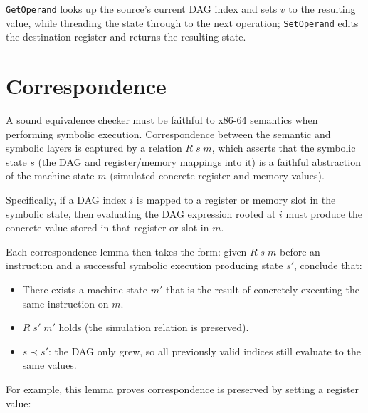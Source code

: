 
\noindent \texttt{GetOperand} looks up the source's current DAG index and sets $v$ to the resulting value, while threading the state through to the next operation; \texttt{SetOperand} edits the destination register and returns the resulting state.

\section{Correspondence}

A sound equivalence checker must be faithful to x86-64 semantics when performing symbolic execution.
Correspondence between the semantic and symbolic layers is captured by a relation $R\; s\; m$, which asserts that the symbolic state $s$ (the DAG and register/memory mappings into it) is a faithful abstraction of the machine state $m$ (simulated concrete register and memory values). 

Specifically, if a DAG index $i$ is mapped to a register or memory slot in the symbolic state, then evaluating the DAG expression rooted at $i$ must produce the concrete value stored in that register or slot in $m$. 

Each correspondence lemma then takes the form: given $R\; s\; m$ before an instruction and a successful symbolic execution producing state $s'$, conclude that:
\begin{itemize}
    \item There exists a machine state $m'$ that is the result of concretely executing the same instruction on $m$.
    \item $R\; s'\; m'$ holds (the simulation relation is preserved).
    \item $s \prec s'$: the DAG only grew, so all previously valid indices still evaluate to the same values.
\end{itemize}

For example, this lemma proves correspondence is preserved by setting a register value:




